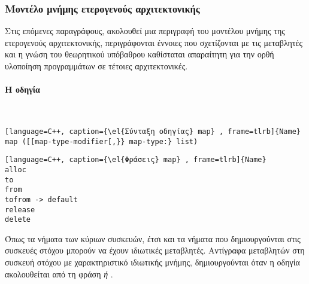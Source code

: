 \subsubsection{Μοντέλο μνήμης ετερογενούς αρχιτεκτονικής}
Στις επόμενες παραγράφους, ακολουθεί μια περιγραφή του μοντέλου μνήμης της ετερογενούς αρχιτεκτονικής, περιγράφονται έννοιες που σχετίζονται με τις μεταβλητές και η γνώση του θεωρητικού υπόβαθρου καθίσταται απαραίτητη για την ορθή υλοποίηση προγραμμάτων σε τέτοιες αρχιτεκτονικές.
\clearpage
\paragraph{Η οδηγία \emph{}}
\ \\
\begin{spacing}{0.8}
\begin{lstlisting}[language=C++, caption={\el{Σύνταξη οδηγίας} map} , frame=tlrb]{Name}
map ([[map-type-modifier[,}} map-type:} list)
\end{lstlisting}
\end{spacing}

\begin{spacing}{0.8}
\begin{lstlisting}[language=C++, caption={\el{Φράσεις} map} , frame=tlrb]{Name}
alloc
to
from
tofrom -> default
release
delete
\end{lstlisting}
\end{spacing}

Όπως τα νήματα των κύριων συσκευών, έτσι και τα νήματα που δημιουργούνται στις συσκευές στόχου μπορούν να έχουν ιδιωτικές μεταβλητές. Αντίγραφα μεταβλητών στη συσκευή στόχου με χαρακτηριστικό ιδιωτικής μνήμης, δημιουργούνται όταν η οδηγία \emph{} ακολουθείται από τη φράση \emph{ ή }.

